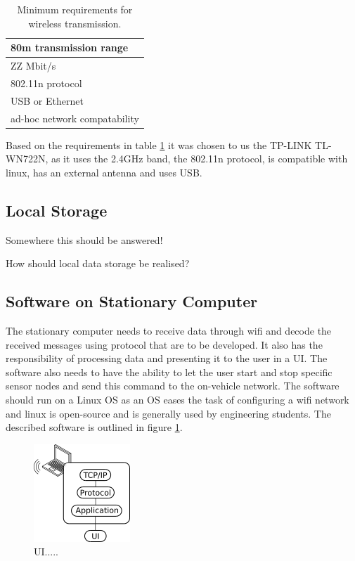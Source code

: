 \begin{table}[]
\centering
\caption{Minimum requirements for wireless transmission.}
\label{tab:req_wifi}
\begin{tabular}{|l|}
\hline
80m transmission range       \\ \hline
ZZ Mbit/s                    \\ \hline
802.11n protocol             \\ \hline
USB or Ethernet              \\ \hline
ad-hoc network compatability \\ \hline
\end{tabular}
\end{table}
Based on the requirements in table \ref{tab:req_wifi} it was chosen to us the TP-LINK TL-WN722N, as it uses the 2.4GHz band, the 802.11n protocol, is compatible with linux, has an external antenna and uses USB. 












\subsection{Local Storage}
Somewhere this should be answered!

How should local data storage be realised?







\subsection{Software on Stationary Computer}
The stationary computer needs to receive data through wifi and decode the received messages using protocol that are to be developed. 
It also has the responsibility of processing data and presenting it to the user in a UI.
The software also needs to have the ability to let the user start and stop specific sensor nodes and send this command to the on-vehicle network. 
The software should run on a Linux OS as an OS eases the task of configuring a wifi network and linux is open-source and is generally used by engineering students.
The described software is outlined in figure \ref{fig:setup_ui}.


\begin{figure}[h]
	\centering
	\includegraphics{graphics/UI}
	\caption{UI.....}
	\label{fig:setup_ui}
\end{figure}

